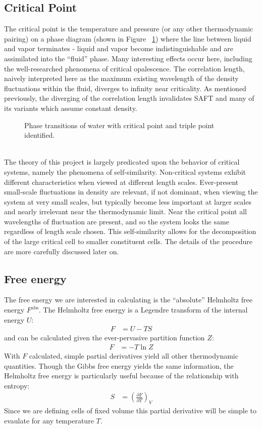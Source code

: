 \documentclass[12pt]{article}
\begin{document}
\subsection{Critical Point} 
The critical point is the temperature and pressure (or any other thermodynamic pairing) on a phase diagram (shown in Figure ~\ref{phase}) where the line between liquid and vapor terminates - liquid and vapor become indistinguishable and are assimilated into the ``fluid'' phase. Many interesting effects occur here, including the well-researched phenomena of critical opalescence. The correlation length, naively interpreted here as the maximum existing wavelength of the density fluctuations within the fluid, diverges to infinity near criticality. As mentioned previously, the diverging of the correlation length invalidates SAFT and many of its variants which assume constant density. 
\begin{figure}
    \centering
    \caption{Phase transitions of water with critical point and triple point identified.}
    \label{phase}
\end{figure}
\\
The theory of this project is largely predicated upon the behavior of critical systems, namely the phenomena of self-similarity. Non-critical systems exhibit different characteristics when viewed at different length scales. Ever-present small-scale fluctuations in density are relevant, if not dominant, when viewing the system at very small scales, but typically become less important at larger scales and nearly irrelevant near the thermodynamic limit. Near the critical point all wavelengths of fluctuation are present, and so the system looks the same regardless of length scale chosen. This self-similarity allows for the decomposition of the large critical cell to smaller constituent cells. The details of the procedure are more carefully discussed later on.   

\subsection{Free energy}
The free energy we are interested in calculating is the ``absolute'' Helmholtz free energy $F^{\text{abs}}$. The Helmholtz free energy is a Legendre transform of the internal energy $U$:
\begin{align}
    F &= U - TS
    \label{Fdef}
\end{align}
and can be calculated given the ever-pervasive partition function $Z$:
\begin{align}
    F &= -T \ln Z
    \label{FdefSM}
\end{align}
With $F$ calculated, simple partial derivatives yield all other thermodynamic quantities. Though the Gibbs free energy yields the same information, the Helmholtz free energy is particularly useful because of the relationship with entropy:
\begin{align}
    S &= \left(\frac{\partial F}{\partial T}\right)_{V}
\end{align}
Since we are defining cells of fixed volume this partial derivative will be simple to evaulate for any temperature $T$.\\
\end{document}
